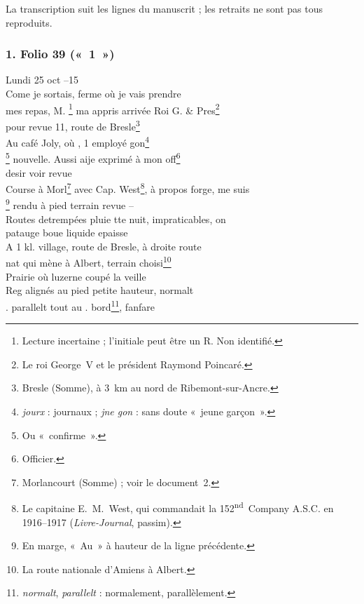 La transcription suit les lignes du manuscrit ; les retraits ne sont pas tous reproduits.

\subsubsection*{1. Folio 39 («~1~»)}

\begin{LJlettre}
\noindent{} \hfill Lundi 25 oct --15 \hfill {}\\
\quad Come je sortais, ferme où je vais prendre\\
mes repas, M. \footnote{Lecture incertaine ; l'initiale peut être un R. Non identifié.}  ma appris arrivée Roi G. \& Pres\footnote{Le roi George~V et le président Raymond Poincaré.}\\
pour revue 11, route de Bresle\footnote{Bresle (Somme), à 3~km au nord de Ribemont-sur-Ancre.}\\
Au café Joly, où  , 1 employé  gon\footnote{\textit{jourx} : journaux ; \textit{jne gon} : sans doute «~jeune garçon~».}\\
\footnote{Ou «~confirme~».} nouvelle. Aussi aije exprimé à mon off\footnote{Officier.}\\
desir voir revue\\
Course à Morl\footnote{Morlancourt (Somme) ; voir le document~2.} avec Cap. West\footnote{Le capitaine E.~M.~West, qui commandait la 152\textsuperscript{nd}~Company A.S.C. en 1916--1917 (\textit{Livre-Journal}, passim).}, à propos forge, me suis\\
\footnote{En marge, «~Au~» à hauteur de la ligne précédente.} rendu à pied terrain revue --\\
\quad Routes detrempées pluie tte nuit, impraticables, on\\
patauge boue liquide epaisse\\
\quad A 1 kl. village, route de Bresle, à droite route\\
nat qui mène à Albert, terrain choisi\footnote{La route nationale d'Amiens à Albert.}\\
Prairie où luzerne coupé la veille\\
 Reg alignés au pied petite hauteur, normalt\\
 . parallelt tout au . bord\footnote{\textit{normalt}, \textit{parallelt} : normalement, parallèlement.}, fanfare\\

\end{LJlettre}
